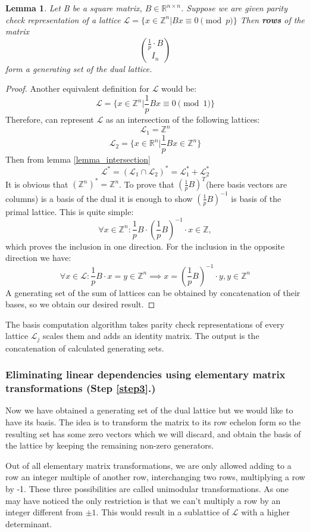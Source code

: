 \documentclass[12pt]{article}
\newcommand{\ZZ}{\mathbb{Z}}
\newcommand{\LL}{\mathcal{L}}
\newtheorem{lemma}{Lemma}
\begin{document}
\begin{lemma}\label{lemma:dual_gen_set}
    Let B be a square matrix, $B \in \mathbb{R}^{n \times n}$. Suppose we are given parity check representation of a lattice $\LL = \{x \in \ZZ^{n} | Bx \equiv 0 \pmod{p}\}$
    Then \textbf{rows} of the matrix
    \[
    \binom{\frac{1}{p} \cdot B}{I_{n}}
    \]
    form a generating set of the dual lattice.
\end{lemma}
\begin{proof}
    Another equivalent definition for $\LL$ would be:
    \[
        \LL  = \{x \in \ZZ^{n} | \frac{1}{p}Bx \equiv 0 \pmod{1}\}
    \]
Therefore, can represent $\LL$ as an intersection of the following lattices:
\[
    \LL_{1}  = \ZZ^{n}
\]
\[
    \LL_{2}  = \{x \in \mathbb{R}^{n} | \frac{1}{p}Bx \in \ZZ^{n} \}
\]
Then from lemma \ref{lemma_intersection}
\[
    \LL^{*}  = (\LL_{1} \cap \LL_{2})^{*} = \LL_{1}^{*} + \LL_{2}^{*}
\]
It is obvious that $(\ZZ^{n})^{*} = \ZZ^{n}$. To prove that $(\frac{1}{p}B)^{T}$(here basis vectors are columns) is a basis of the dual it is enough to show $(\frac{1}{p}B)^{-1}$ is basis of the primal lattice. This is quite simple:
\[
    \forall x \in \ZZ^{n}: \frac{1}{p}B \cdot (\frac{1}{p}B)^{-1} \cdot x \in \ZZ,
\]
which proves the inclusion in one direction. For the inclusion in the opposite direction we have:
\[
    \forall x \in \LL: \frac{1}{p}B \cdot x = y \in \ZZ^{n} \implies x = (\frac{1}{p}B)^{-1} \cdot y , y \in \ZZ^{n}
\]
A generating set of the sum of lattices can be obtained by concatenation of their bases, so we obtain our desired result.
\end{proof}

The basis computation algorithm takes parity check representations of every lattice $\LL_{j}$ scales them and adds an identity matrix. The output is the concatenation of calculated generating sets.

\subsubsection{Eliminating linear dependencies using elementary matrix transformations (Step \ref{step3}.)}
\label{subsubsec:hermite_form}
Now we have obtained a generating set of the dual lattice but we would like to have its basis. The idea is to transform the matrix to its row echelon form so the resulting set has some zero vectors which we will discard, and obtain the basis of the lattice by keeping the remaining non-zero generators.

Out of all elementary matrix transformations, we are only allowed adding to a row an integer multiple of another row, interchanging two rows, multiplying a row by -1. These three possibilities are called unimodular transformations. As one may have noticed the only restriction is that we can't multiply a row by an integer different from $\pm 1$. This would result in a sublattice of $\LL$ with a higher determinant.
\end{document}
